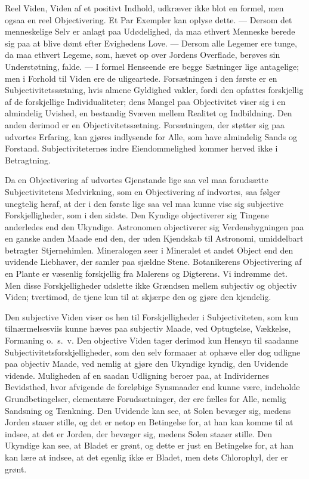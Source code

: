 \documentclass[12pt]{book}
\newcommand{\apage}[1]{\marginnote{\footnotesize\textit{[#1]}}}
\begin{document}
Reel Viden, Viden af et positivt Indhold, udkræver ikke blot en formel,
men ogsaa en reel Objectivering. Et Par Exempler kan oplyse dette. --- Dersom det menneskelige Selv er anlagt paa Udødelighed, da maa ethvert
Menneske berede sig paa at blive dømt efter Evighedens Love. ---
Dersom alle Legemer ere tunge, da maa ethvert Legeme, som, hævet op
over Jordens Overflade, berøves sin Understøtning, falde. --- I formel
Henseende ere begge Sætninger lige antagelige; men i Forhold til Viden
ere de uligeartede. Forsætningen i den første er en
Subjectivitetssætning, hvis almene Gyldighed vakler, fordi den opfattes
forskjellig af de forskjellige Individualiteter; dens Mangel paa
Objectivitet viser sig i en almindelig Uvished, en bestandig Svæven
mellem Realitet og Indbildning. Den anden derimod er en
Objectivitetssætning. Forsætningen, der støtter sig paa udvortes
Erfaring, kan gjøres indlysende for Alle, som have almindelig Sands \apage{46} og
Forstand. Subjectiviteternes indre Eiendommelighed kommer herved ikke
i Betragtning.

Da en Objectivering af udvortes Gjenstande lige saa vel maa forudsætte
Subjectivitetens Medvirkning, som en Objectivering af indvortes, saa
følger unegtelig heraf, at der i den første lige saa vel maa kunne
vise sig subjective Forskjelligheder, som i den sidste. Den Kyndige
objectiverer sig Tingene anderledes end den Ukyndige. Astronomen
objectiverer sig Verdensbygningen paa en ganske anden Maade end den,
der uden Kjendskab til Astronomi, umiddelbart betragter Stjernehimlen.
Mineralogen seer i Mineralet et andet Object end den uvidende Liebhaver,
der samler paa sjældne Stene. Botanikerens Objectivering af en Plante
er væsenlig forskjellig fra Malerens og Digterens. Vi indrømme det.
Men disse Forskjelligheder udslette ikke Grændsen mellem subjectiv og
objectiv Viden; tvertimod, de tjene kun til at skjærpe den og gjøre
den kjendelig.

Den subjective Viden viser os hen til Forskjelligheder i
Subjectiviteten, som kun tilnærmelsesviis kunne hæves paa subjectiv
Maade, ved Optugtelse, Vækkelse, Formaning o.\ s.\ v. Den objective Viden
tager derimod kun Hensyn til saadanne Subjectivitetsforskjelligheder,
som den selv formaaer at ophæve eller dog udligne paa objectiv Maade,
ved nemlig at gjøre den Ukyndige kyndig, den Uvidende vidende.
Muligheden af en saadan Udligning beroer paa, at Individernes
Bevidsthed, hvor afvigende de foreløbige Synsmaader end kunne være,
indeholde Grundbetingelser, elementære \apage{47} Forudsætninger, der ere fælles
for Alle, nemlig Sandsning og Tænkning. Den Uvidende kan see, at Solen
bevæger sig, medens Jorden staaer stille, og det er netop en Betingelse
for, at han kan komme til at indsee, at det er Jorden, der bevæger sig,
medens Solen staaer stille. Den Ukyndige kan see, at Bladet er grønt,
og dette er just en Betingelse for, at han kan lære at indsee, at det
egenlig ikke er Bladet, men dets Chlorophyl, der er grønt.
\end{document}
